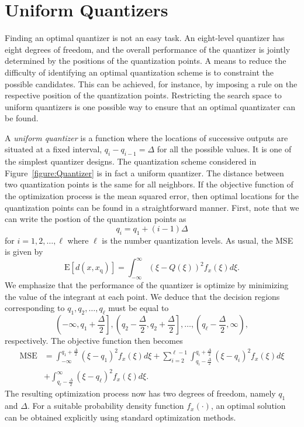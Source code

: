 \section{Uniform Quantizers}

Finding an optimal quantizer is not an easy task.
An eight-level quantizer has eight degrees of freedom, and the overall performance of the quantizer is jointly determined by the positions of the quantization points.
A means to reduce the difficulty of identifying an optimal quantization scheme is to constraint the possible candidates.
This can be achieved, for instance, by imposing a rule on the respective position of the quantization points.
Restricting the search space to uniform quantizers is one possible way to ensure that an optimal quantizater can be found.

A \emph{uniform quantizer} is a function where the locations of successive outputs are situated at a fixed interval, $q_i - q_{i-1} = \Delta$ for all the possible values.
It is one of the simplest quantizer designs.
The quantization scheme considered in Figure~\ref{figure:Quantizer} is in fact a uniform quantizer.
The distance between two quantization points is the same for all neighbors.
If the objective function of the optimization process is the mean squared error, then optimal locations for the quantization points can be found in a straightforward manner.
First, note that we can write the postion of the quantization points as
\begin{equation*}
q_i = q_1 + (i-1) \Delta
\end{equation*}
for $i = 1, 2, \ldots, \ell$ where $\ell$ is the number quantization levels.
As usual, the MSE is given by
\begin{equation*}
\mathrm{E} [ d(x, x_{\mathrm{q}}) ]
= \int_{-\infty}^{\infty} (\xi - Q(\xi))^2 f_x(\xi) d\xi .
\end{equation*}
We emphasize  that the performance of the quantizer is optimize by minimizing the value of the integrant at each point.
We deduce that the decision regions corresponding to $q_1, q_2, \ldots, q_{\ell}$ must be equal to
\begin{equation*}
\left( - \infty, q_1 + \frac{\Delta}{2} \right],
\left( q_2 - \frac{\Delta}{2}, q_2 + \frac{\Delta}{2} \right],
\ldots,
\left( q_{\ell} - \frac{\Delta}{2}, \infty \right) ,
\end{equation*}
respectively.
The objective function then becomes
\begin{equation} \label{equation:UniformQuantizerMSE}
\begin{split}
\text{MSE} &= \int_{-\infty}^{q_1 + \frac{\Delta}{2}} (\xi - q_1)^2 f_x(\xi) d\xi
+ \sum_{i=2}^{{\ell}-1}
\int_{q_i - \frac{\Delta}{2}}^{q_i + \frac{\Delta}{2}}
(\xi - q_i)^2 f_x(\xi) d\xi \\
&+ \int_{q_{\ell} - \frac{\Delta}{2}}^{\infty} (\xi - q_{\ell})^2 f_x(\xi) d\xi .
\end{split}
\end{equation}
The resulting optimization process now has two degrees of freedom, namely $q_1$ and $\Delta$.
For a suitable probability density function $f_x(\cdot)$, an optimal solution can be obtained explicitly using standard optimization methods.

